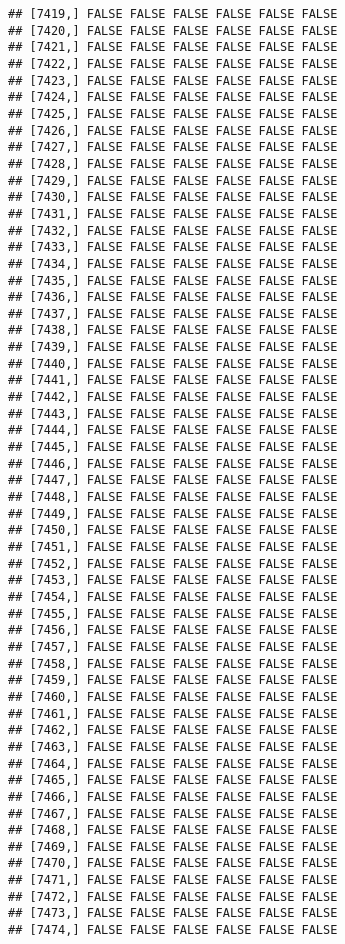 \documentclass[
]{article}
\begin{document}
\begin{verbatim}
## [7419,] FALSE FALSE FALSE FALSE FALSE FALSE
## [7420,] FALSE FALSE FALSE FALSE FALSE FALSE
## [7421,] FALSE FALSE FALSE FALSE FALSE FALSE
## [7422,] FALSE FALSE FALSE FALSE FALSE FALSE
## [7423,] FALSE FALSE FALSE FALSE FALSE FALSE
## [7424,] FALSE FALSE FALSE FALSE FALSE FALSE
## [7425,] FALSE FALSE FALSE FALSE FALSE FALSE
## [7426,] FALSE FALSE FALSE FALSE FALSE FALSE
## [7427,] FALSE FALSE FALSE FALSE FALSE FALSE
## [7428,] FALSE FALSE FALSE FALSE FALSE FALSE
## [7429,] FALSE FALSE FALSE FALSE FALSE FALSE
## [7430,] FALSE FALSE FALSE FALSE FALSE FALSE
## [7431,] FALSE FALSE FALSE FALSE FALSE FALSE
## [7432,] FALSE FALSE FALSE FALSE FALSE FALSE
## [7433,] FALSE FALSE FALSE FALSE FALSE FALSE
## [7434,] FALSE FALSE FALSE FALSE FALSE FALSE
## [7435,] FALSE FALSE FALSE FALSE FALSE FALSE
## [7436,] FALSE FALSE FALSE FALSE FALSE FALSE
## [7437,] FALSE FALSE FALSE FALSE FALSE FALSE
## [7438,] FALSE FALSE FALSE FALSE FALSE FALSE
## [7439,] FALSE FALSE FALSE FALSE FALSE FALSE
## [7440,] FALSE FALSE FALSE FALSE FALSE FALSE
## [7441,] FALSE FALSE FALSE FALSE FALSE FALSE
## [7442,] FALSE FALSE FALSE FALSE FALSE FALSE
## [7443,] FALSE FALSE FALSE FALSE FALSE FALSE
## [7444,] FALSE FALSE FALSE FALSE FALSE FALSE
## [7445,] FALSE FALSE FALSE FALSE FALSE FALSE
## [7446,] FALSE FALSE FALSE FALSE FALSE FALSE
## [7447,] FALSE FALSE FALSE FALSE FALSE FALSE
## [7448,] FALSE FALSE FALSE FALSE FALSE FALSE
## [7449,] FALSE FALSE FALSE FALSE FALSE FALSE
## [7450,] FALSE FALSE FALSE FALSE FALSE FALSE
## [7451,] FALSE FALSE FALSE FALSE FALSE FALSE
## [7452,] FALSE FALSE FALSE FALSE FALSE FALSE
## [7453,] FALSE FALSE FALSE FALSE FALSE FALSE
## [7454,] FALSE FALSE FALSE FALSE FALSE FALSE
## [7455,] FALSE FALSE FALSE FALSE FALSE FALSE
## [7456,] FALSE FALSE FALSE FALSE FALSE FALSE
## [7457,] FALSE FALSE FALSE FALSE FALSE FALSE
## [7458,] FALSE FALSE FALSE FALSE FALSE FALSE
## [7459,] FALSE FALSE FALSE FALSE FALSE FALSE
## [7460,] FALSE FALSE FALSE FALSE FALSE FALSE
## [7461,] FALSE FALSE FALSE FALSE FALSE FALSE
## [7462,] FALSE FALSE FALSE FALSE FALSE FALSE
## [7463,] FALSE FALSE FALSE FALSE FALSE FALSE
## [7464,] FALSE FALSE FALSE FALSE FALSE FALSE
## [7465,] FALSE FALSE FALSE FALSE FALSE FALSE
## [7466,] FALSE FALSE FALSE FALSE FALSE FALSE
## [7467,] FALSE FALSE FALSE FALSE FALSE FALSE
## [7468,] FALSE FALSE FALSE FALSE FALSE FALSE
## [7469,] FALSE FALSE FALSE FALSE FALSE FALSE
## [7470,] FALSE FALSE FALSE FALSE FALSE FALSE
## [7471,] FALSE FALSE FALSE FALSE FALSE FALSE
## [7472,] FALSE FALSE FALSE FALSE FALSE FALSE
## [7473,] FALSE FALSE FALSE FALSE FALSE FALSE
## [7474,] FALSE FALSE FALSE FALSE FALSE FALSE

\end{verbatim}
\end{document}
